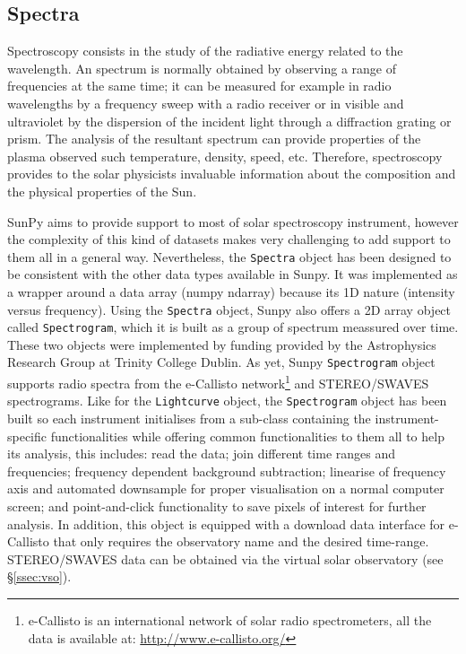 \subsection{Spectra}\label{sec:spectra}

Spectroscopy consists in the study of the radiative energy related to the wavelength.
An spectrum is normally obtained by observing a range of frequencies at the same time; 
it can be measured for example in radio wavelengths by a frequency sweep with 
a radio receiver or in visible and ultraviolet by the dispersion of the incident light 
through a diffraction grating or prism.
The analysis of the resultant spectrum can provide properties of the plasma observed 
such temperature, density, speed, etc.
Therefore, spectroscopy provides to the solar physicists invaluable information about 
the composition and the physical properties of the Sun.  

SunPy aims to provide support to most of solar spectroscopy instrument, however the 
complexity of this kind of datasets makes very challenging to add support to them all 
in a general way.  
Nevertheless, the \texttt{Spectra} object has been designed to be consistent with the 
other data types available in Sunpy.
It was implemented as a wrapper around a data array (numpy ndarray)
because its 1D nature (intensity versus frequency).
Using the \texttt{Spectra} object, Sunpy also offers a 2D array object called \texttt{Spectrogram},
which it is built as a group of spectrum meassured over time.
These two objects were implemented by funding provided by the Astrophysics Research 
Group at Trinity College Dublin.
As yet, Sunpy \texttt{Spectrogram} object supports radio spectra from the e-Callisto 
network\footnote{e-Callisto is an international network of solar radio spectrometers, 
                 all the data is available at: \url{http://www.e-callisto.org/} } 
and STEREO/SWAVES spectrograms.
Like for the \texttt{Lightcurve} object, the \texttt{Spectrogram} object has been
built so each instrument initialises from a sub-class containing the instrument-specific 
functionalities while offering common functionalities to them all to help its analysis, 
this includes:
read the data; %
join different time ranges and frequencies; 
frequency dependent background subtraction;  
linearise of frequency axis and automated downsample for proper visualisation on a normal computer screen;  
and point-and-click functionality to save pixels of interest for further analysis.
In addition, this object is equipped with a download data interface for e-Callisto that 
only requires the observatory name and the desired time-range. 
STEREO/SWAVES data can be obtained via the virtual solar observatory (see \S\ref{ssec:vso}).

